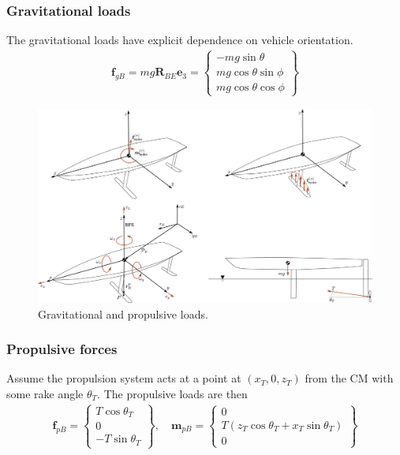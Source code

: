 \documentclass[10pt]{article}
\newcommand{\mbf}[1]{\mathbf{#1}}
\newcommand{\ben}{\begin{eqnarray*}}
\newcommand{\een}{\end{eqnarray*}}
\begin{document}
\subsubsection{Gravitational loads}
% 
The gravitational loads have explicit dependence on vehicle orientation.
\ben
\mbf{f}_{g B}= mg \mbf{R}_{BE} \mbf{e}_3 = \left\{\begin{array}{c}
	-m g \sin \theta          \\
	m g \cos \theta \sin \phi \\
	m g \cos \theta \cos \phi
\end{array}\right\}
\een
\begin{figure}[htb!]
	\centering
	\includegraphics[width=0.6\linewidth,clip,trim={37cm 0cm 0cm 30cm}]{SeakeepingDiagram.pdf}
	\caption{\label{fig:Loads}
		Gravitational and propulsive loads.
	}
\end{figure}

\subsubsection{Propulsive forces}
% 
Assume the propulsion system acts at a point at $(x_T,0,z_T)$ from the CM with some rake angle $\theta_T$.
The propulsive loads are then
\ben
\mbf{f}_{p B}=\left\{\begin{array}{c}
	T \cos \theta_T \\
	0               \\
	-T \sin \theta_T
\end{array}\right\},
\quad
\mbf{m}_{p B}=\left\{\begin{array}{c}
	0                                                 \\
	T\left(z_T \cos \theta_T+x_T \sin \theta_T\right) \\
	0
\end{array}\right\}
\een
% 
\end{document}
